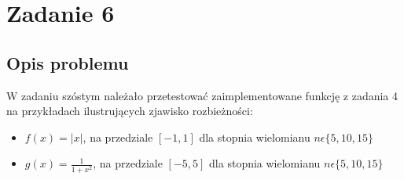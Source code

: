 \documentclass[]{article}
\begin{document}
\section{Zadanie 6}
\subsection{Opis problemu}
W zadaniu szóstym należało przetestować zaimplementowane funkcję z zadania 4 na przykładach ilustrujących zjawisko rozbieżności:
\begin{itemize}
	\item $f(x) = |x|$, na przedziale $[-1, 1]$ dla stopnia wielomianu $n \epsilon \{5, 10, 15\}$
	\item $g(x) = \frac{1}{1+x^2}$, na przedziale $[-5, 5]$ dla stopnia wielomianu $n \epsilon \{5, 10, 15\}$
\end{itemize}
\end{document}
